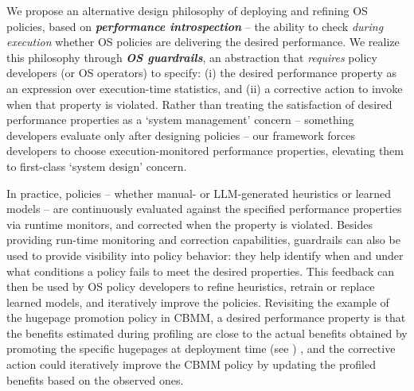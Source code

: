 We propose an alternative design philosophy of deploying and refining OS policies, based on {\it \textbf{performance introspection}} -- the ability to check {\em during execution} whether OS policies are delivering the desired performance. 
We realize this philosophy through {\it \textbf{OS guardrails}}, an abstraction that {\em requires} policy developers (or OS operators) to specify: (i) the desired performance property as an expression over execution-time statistics, and (ii) a corrective action to invoke when that property is violated.
Rather than treating the satisfaction of desired performance properties as a `system management' concern -- something developers evaluate only after designing policies -- our framework forces developers to choose execution-monitored performance properties, elevating them to first-class `system design' concern. 

In practice, policies -- whether manual- or LLM-generated heuristics or learned models -- are continuously evaluated against the specified performance properties via runtime monitors, and corrected when the property is violated.
Besides providing run-time monitoring and correction capabilities, guardrails can also be used to provide visibility into policy behavior: they help identify when and under what conditions a policy fails to meet the desired properties.
This feedback can then be used by OS policy developers to refine heuristics, retrain or replace learned models, and iteratively improve the policies.
Revisiting the example of the hugepage promotion policy in CBMM, a desired  performance property is
 that the benefits estimated during profiling are close to the actual benefits obtained by promoting the specific hugepages at deployment time (see ) , and the corrective action could iteratively improve the CBMM policy by updating the profiled benefits based on the observed ones. 

